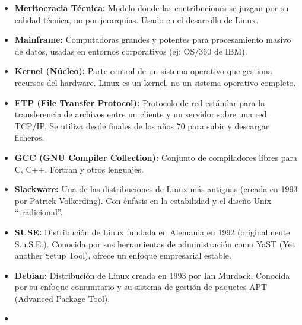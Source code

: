 \documentclass[a4paper,12pt]{article}
\begin{document}
\begin{itemize}
    \item \textbf{Meritocracia Técnica:} Modelo donde las contribuciones se juzgan por su calidad técnica, no por jerarquías. Usado en el desarrollo de Linux.
    \label{meritocracia}

    \item \textbf{Mainframe:} Computadoras grandes y potentes para procesamiento masivo de datos, usadas en entornos corporativos (ej: OS/360 de IBM).
    \label{mainframe}

    \item \textbf{Kernel (Núcleo):} Parte central de un sistema operativo que gestiona recursos del hardware. Linux es un kernel, no un sistema operativo completo.
    \label{kernel}

    \item \textbf{FTP (File Transfer Protocol):} Protocolo de red estándar para la transferencia de archivos entre un cliente y un servidor sobre una red TCP/IP. Se utiliza desde finales de los años 70 para subir y descargar ficheros.
    \label{ftp}

    \item \textbf{GCC (GNU Compiler Collection):} Conjunto de compiladores libres para C, C++, Fortran y otros lenguajes.
    \label{gcc}

    \item \textbf{Slackware:} Una de las distribuciones de Linux más antiguas (creada en 1993 por Patrick Volkerding). Con énfasis en la estabilidad y el diseño Unix “tradicional”.
    \label{slackware}

    \item \textbf{SUSE:} Distribución de Linux fundada en Alemania en 1992 (originalmente S.u.S.E.). Conocida por sus herramientas de administración como YaST (Yet another Setup Tool), ofrece un enfoque empresarial estable.
    \label{suse}

    \item \textbf{Debian:} Distribución de Linux creada en 1993 por Ian Murdock. Conocida por su enfoque comunitario y su sistema de gestión de paquetes APT (Advanced Package Tool).
    \item \label{debian}

\end{itemize}
\end{document}

